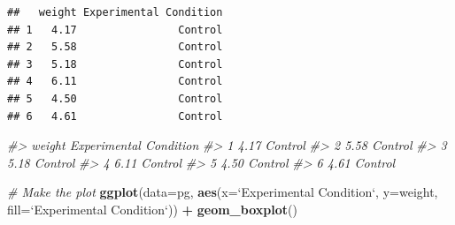 \documentclass[]{article}
\newenvironment{Shaded}{\begin{snugshade}}{\end{snugshade}}
\newcommand{\KeywordTok}[1]{\textcolor[rgb]{0.13,0.29,0.53}{\textbf{#1}}}
\newcommand{\DataTypeTok}[1]{\textcolor[rgb]{0.13,0.29,0.53}{#1}}
\newcommand{\StringTok}[1]{\textcolor[rgb]{0.31,0.60,0.02}{#1}}
\newcommand{\CommentTok}[1]{\textcolor[rgb]{0.56,0.35,0.01}{\textit{#1}}}
\newcommand{\OperatorTok}[1]{\textcolor[rgb]{0.81,0.36,0.00}{\textbf{#1}}}
\newcommand{\NormalTok}[1]{#1}
\begin{document}
\begin{Shaded}
\end{Shaded}

\begin{verbatim}
##   weight Experimental Condition
## 1   4.17                Control
## 2   5.58                Control
## 3   5.18                Control
## 4   6.11                Control
## 5   4.50                Control
## 6   4.61                Control
\end{verbatim}

\begin{Shaded}
\begin{Highlighting}[]
\CommentTok{#>   weight Experimental Condition}
\CommentTok{#> 1   4.17                Control}
\CommentTok{#> 2   5.58                Control}
\CommentTok{#> 3   5.18                Control}
\CommentTok{#> 4   6.11                Control}
\CommentTok{#> 5   4.50                Control}
\CommentTok{#> 6   4.61                Control}

\CommentTok{# Make the plot }
\KeywordTok{ggplot}\NormalTok{(}\DataTypeTok{data=}\NormalTok{pg, }\KeywordTok{aes}\NormalTok{(}\DataTypeTok{x=}\StringTok{`}\DataTypeTok{Experimental Condition}\StringTok{`}\NormalTok{, }\DataTypeTok{y=}\NormalTok{weight, }\DataTypeTok{fill=}\StringTok{`}\DataTypeTok{Experimental Condition}\StringTok{`}\NormalTok{)) }\OperatorTok{+}
\StringTok{    }\KeywordTok{geom_boxplot}\NormalTok{()}
\end{Highlighting}
\end{Shaded}
\end{document}
